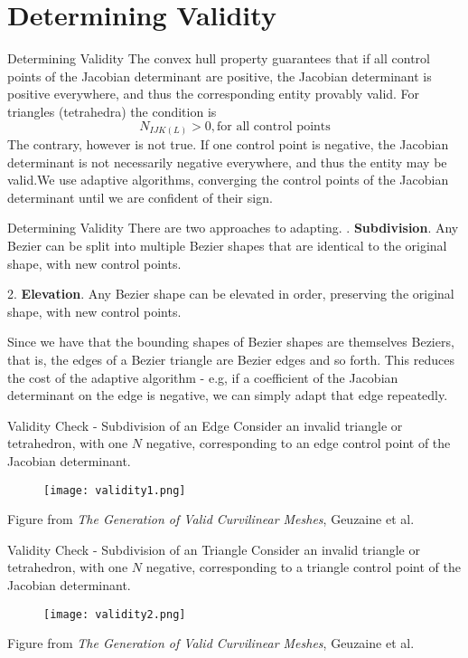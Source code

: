 \documentclass[12pt]{beamer}
\newcommand{\spa}{\vspace{0.5cm}\newline}
\begin{document}
\section{Determining Validity}
\begin{frame}{Determining Validity}
The convex hull property guarantees that if all control points of the Jacobian determinant are positive, the Jacobian determinant is positive everywhere, and thus the corresponding entity provably valid. For triangles (tetrahedra) the condition is
\[ N_{IJK(L)} > 0, \text{for all control points}\]
The contrary, however is not true. If one control point is negative, the Jacobian determinant is not necessarily negative everywhere, and thus the entity may be valid.\spa We use adaptive algorithms, converging the control points of the Jacobian determinant until we are confident of their sign.
\end{frame}
\begin{frame}{Determining Validity}
There are two approaches to adapting. \spa
1. {\bf Subdivision}. Any Bezier  can be split into multiple Bezier shapes that are identical to the original shape, with new control points.

2. {\bf Elevation}. Any Bezier shape can be elevated in order, preserving the original shape, with new control points. \spa

Since we have that the bounding shapes of Bezier shapes are themselves Beziers, that is, the edges of a Bezier triangle are Bezier edges and so forth. This reduces the cost of the adaptive algorithm - e.g, if a coefficient of the Jacobian determinant on the edge is negative, we can simply adapt that edge repeatedly.
\end{frame}
\begin{frame}{Validity Check - Subdivision of an Edge}
Consider an invalid triangle or tetrahedron, with one $N$ negative, corresponding to an edge control point of the Jacobian determinant.
\begin{figure}
  \centering
  \texttt{[image: validity1.png]} 
\end{figure}
Figure from {\it The Generation of Valid Curvilinear Meshes}, Geuzaine et al.
\end{frame}
\begin{frame}{Validity Check - Subdivision of an Triangle}
Consider an invalid triangle or tetrahedron, with one $N$ negative, corresponding to a triangle control point of the Jacobian determinant. 
\begin{figure}
  \centering
  \texttt{[image: validity2.png]} 
\end{figure}
Figure from {\it The Generation of Valid Curvilinear Meshes}, Geuzaine et al.
\end{frame}
\end{document}
